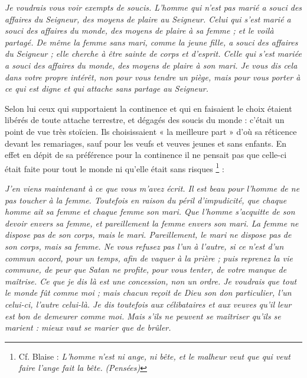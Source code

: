 \begin{displayquote}[I~Cor~7,~32-35]
\emph{Je voudrais vous voir exempts de soucis. L'homme qui n'est pas marié a souci des affaires du Seigneur, des moyens de plaire au Seigneur. Celui qui s'est marié a souci des affaires du monde, des moyens de plaire à sa femme ; et le voilà partagé. De même la femme sans mari, comme la jeune fille, a souci des affaires du Seigneur ; elle cherche à être sainte de corps et d'esprit. Celle qui s'est mariée a souci des affaires du monde, des moyens de plaire à son mari. Je vous dis cela dans votre propre intérêt, non pour vous tendre un piège, mais pour vous porter à ce qui est digne et qui attache sans partage au Seigneur.}
\end{displayquote}

 Selon lui ceux qui supportaient la continence et qui en faisaient le choix étaient libérés de toute attache terrestre, et dégagés des soucis du monde : c'était un point de vue très stoïcien. Ils choisissaient « la meilleure part » d'où sa réticence devant les remariages, sauf pour les veufs et veuves jeunes et sans enfants. En effet en dépit de sa préférence pour la continence il ne pensait pas que celle-ci était faite pour tout le monde ni qu'elle était sans risques%
\footnote{Cf. Blaise  : \emph{L'homme n'est ni ange, ni bête, et le malheur veut que qui veut faire l'ange fait la bête.} \emph{(Pensées)}}
:

\begin{displayquote}[I Cor 7, 8-9]
\emph{J'en viens maintenant à ce que vous m'avez écrit. Il est beau pour l'homme de ne pas toucher à la femme. Toutefois en raison du péril d'impudicité, que chaque homme ait sa femme et chaque femme son mari. Que l'homme s'acquitte de son devoir envers sa femme, et pareillement la femme envers son mari. La femme ne dispose pas de son corps, mais le mari. Pareillement, le mari ne dispose pas de son corps, mais sa femme. Ne vous refusez pas l'un à l'autre, si ce n'est d'un commun accord, pour un temps, afin de vaquer à la prière ; puis reprenez la vie commune, de peur que Satan ne profite, pour vous tenter, de votre manque de maîtrise. Ce que je dis là est une concession, non un ordre. Je voudrais que tout le monde fût comme moi ; mais chacun reçoit de Dieu son don particulier, l'un celui-ci, l'autre celui-là. Je dis toutefois aux célibataires et aux veuves qu'il leur est bon de demeurer comme moi. Mais s'ils ne peuvent se maîtriser qu'ils se marient : mieux vaut se marier que de brûler.}
\end{displayquote}

